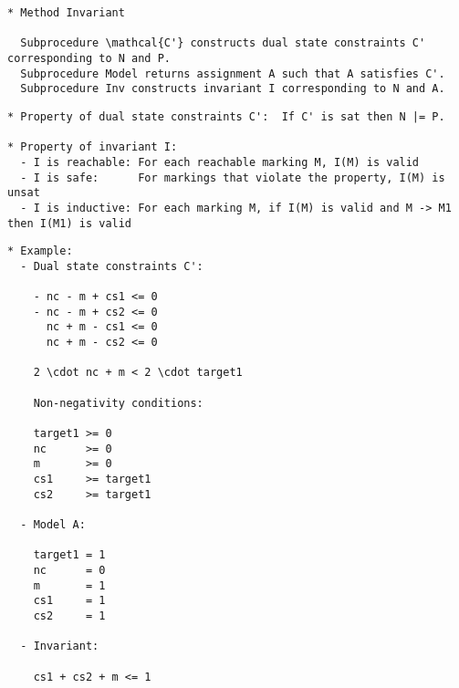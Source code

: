 \documentclass{article}
\begin{document}
\begin{verbatim}
* Method Invariant

  Subprocedure \mathcal{C'} constructs dual state constraints C' corresponding to N and P.
  Subprocedure Model returns assignment A such that A satisfies C'.
  Subprocedure Inv constructs invariant I corresponding to N and A.
\end{verbatim}

\begin{center}
\end{center}

\begin{verbatim}
* Property of dual state constraints C':  If C' is sat then N |= P.

* Property of invariant I:
  - I is reachable: For each reachable marking M, I(M) is valid
  - I is safe:      For markings that violate the property, I(M) is unsat
  - I is inductive: For each marking M, if I(M) is valid and M -> M1 then I(M1) is valid
\end{verbatim}

\newpage
\begin{verbatim}
* Example:
  - Dual state constraints C':

    - nc - m + cs1 <= 0
    - nc - m + cs2 <= 0
      nc + m - cs1 <= 0
      nc + m - cs2 <= 0

    2 \cdot nc + m < 2 \cdot target1

    Non-negativity conditions:

    target1 >= 0
    nc      >= 0
    m       >= 0
    cs1     >= target1
    cs2     >= target1
  
  - Model A:

    target1 = 1
    nc      = 0
    m       = 1
    cs1     = 1
    cs2     = 1
    
  - Invariant:

    cs1 + cs2 + m <= 1

\end{verbatim}
\end{document}
